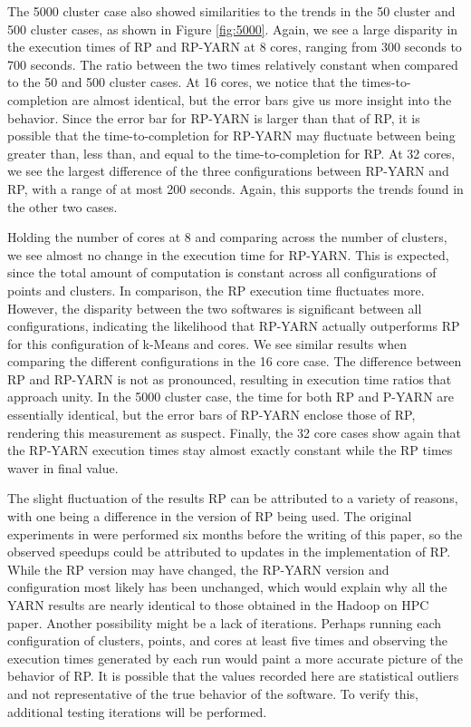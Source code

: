 \documentclass[]{article}
\begin{document}
			The 5000 cluster case also showed similarities to the trends in the 50 cluster and 500 cluster cases, as shown in Figure \ref{fig:5000}. Again, we see a large disparity in the execution times of RP and RP-YARN at 8 cores, ranging from 300 seconds to 700 seconds. The ratio between the two times relatively constant when compared to the 50 and 500 cluster cases. At 16 cores, we notice that the times-to-completion are almost identical, but the error bars give us more insight into the behavior. Since the error bar for RP-YARN is larger than that of RP, it is possible that the time-to-completion for RP-YARN may fluctuate between being greater than, less than, and equal to the time-to-completion for RP. At 32 cores, we see the largest difference of the three configurations between RP-YARN and RP, with a range of at most 200 seconds. Again, this supports the trends found in the other two cases. 


			Holding the number of cores at 8 and comparing across the number of clusters, we see almost no change in the execution time for RP-YARN. This is expected, since the total amount of computation is constant across all configurations of points and clusters. In comparison, the RP execution time fluctuates more. However, the disparity between the two softwares is significant between all configurations, indicating the likelihood that RP-YARN actually outperforms RP for this configuration of k-Means and cores. We see similar results when comparing the different configurations in the 16 core case. The difference between RP and RP-YARN is not as pronounced, resulting in execution time ratios that approach unity. In the 5000 cluster case, the time for both RP and P-YARN are essentially identical, but the error bars of RP-YARN enclose those of RP, rendering this measurement as suspect. Finally, the 32 core cases show again that the RP-YARN execution times stay almost exactly constant while the RP times waver in final value.

			The slight fluctuation of the results RP can be attributed to a variety of reasons, with one being a difference in the version of RP being used. The original experiments in \cite{hadoop_paper} were performed six months before the writing of this paper, so the observed speedups could be attributed to updates in the implementation of RP. While the RP version may have changed, the RP-YARN version and configuration most likely has been unchanged, which would explain why all the YARN results are nearly identical to those obtained in the Hadoop on HPC paper. Another possibility might be a lack of iterations. Perhaps running each configuration of clusters, points, and cores at least five times and observing the execution times generated by each run would paint a more accurate picture of the behavior of RP. It is possible that the values recorded here are statistical outliers and not representative of the true behavior of the software. To verify this, additional testing iterations will be performed. 
\end{document}
